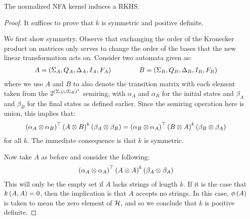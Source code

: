 \documentclass[12pt]{article}
\begin{document}
\begin{theorem}
  The normalized NFA kernel induces a RKHS.
\end{theorem}
\begin{proof}
  It suffices to prove that \(k\) is symmetric and
  positive definite.

  We first show symmetry.
  Observe that exchanging the order of the Kronecker product
  on matrices only serves to change the order of the bases that the
  new linear transformation acts on.
  Consider two automata given as:
  \begin{align*}
    A = \left(\Sigma_A, Q_A, \Delta_A, I_A, F_A\right)
    \qquad \qquad
    B = \left(\Sigma_B, Q_B, \Delta_B, I_B, F_B\right)
  \end{align*}
  where we use \(A\) and \(B\) to also denote the transition matrix
  with each element taken from the
  \(2^{\left(\Sigma_A \cup \Sigma_B\right)^\star}\) semiring,
  with \(\alpha_A\) and \(\alpha_B\) for the initial states
  and \(\beta_A\) and \(\beta_B\) for the final states as defined earlier.
  Since the semiring operation here is union, this implies that:
  \begin{align*}
    \left(\alpha_A \otimes \alpha_B\right)^\top
    \left(A \otimes B\right)^k
    \left(\beta_A \otimes \beta_B\right)
    =
    \left(\alpha_B \otimes \alpha_A\right)^\top
    \left(B \otimes A\right)^k
    \left(\beta_B \otimes \beta_A\right)
  \end{align*}
  for all \(k\).
  The immediate consequence is that \(k\) is symmetric.

  Now take \(A\) as before and consider the following:
  \begin{align*}
    \left(\alpha_A \otimes \alpha_A\right)^\top
    \left(A \otimes A\right)^k
    \left(\beta_A \otimes \beta_A\right)
  \end{align*}
  This will only be the empty set if \(A\)
  lacks strings of length \(k\).
  If it is the case that \(k\left(A, A\right) = 0\),
  then the implication is that \(A\) accepts no strings.
  In this case, \(\phi\left(A\right)\) is taken to mean the zero element of
  \(\mathcal{H}\),
  and so we conclude that \(k\) is positive definite.

\end{proof}
\end{document}
